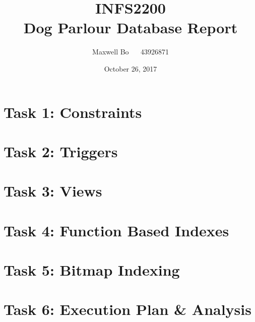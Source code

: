 \documentclass[11pt,a4paper]{report}
\begin{document}
\title{INFS2200 \\ Dog Parlour Database Report}
\author{Maxwell Bo ~~ 43926871}
\date{October 26, 2017}
\maketitle

\section{Task 1: Constraints}
\section{Task 2: Triggers}
\section{Task 3: Views}
\section{Task 4: Function Based Indexes}
\section{Task 5: Bitmap Indexing}
\section{Task 6: Execution Plan \& Analysis}

\end{document}
